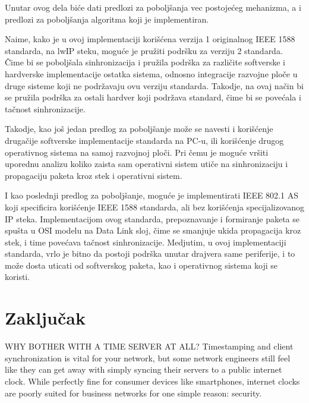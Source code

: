 \documentclass[a4paper,12pt, master]{etf}
\begin{document}
	Unutar ovog dela bi\'{c}e dati predlozi za pobolj\v{s}anja vec
	postoje\'{c}eg mehanizma, a i predlozi za pobolj\v{s}anja algoritma koji je
	implementiran.

	Naime, kako je u ovoj implementaciji kori\v{s}\'{c}ena verzija 1
	originalnog IEEE 1588 standarda, na lwIP steku, mogu\'{c}e je pru\v{z}iti
	podr\v{s}ku za verziju 2 standarda. \v{C}ime bi se pobolj\v{s}ala
	sinhronizacija i pru\v{z}ila podr\v{s}ka za razli\v{c}ite softverske i
	hardverske implementacije ostatka sistema, odnosno integracije razvojne
	plo\v{c}e u druge sisteme koji ne podr\v{z}avaju ovu verziju standarda.
	Takodje, na ovaj na\v{c}in bi se pru\v{z}ila podr\v{s}ka za ostali hardver
	koji podr\v{z}ava standard, \v{c}ime bi se pove\'{c}ala i ta\v{c}nost
	sinhronizacije.

	Takodje, kao jo\v{s} jedan predlog za pobolj\v{s}anje mo\v{z}e se navesti i
	kori\v{s}\'{c}enje druga\v{c}ije softverske implementacije standarda na
	PC-u, ili kori\v{s}\'{c}enje drugog operativnog sistema na samoj razvojnoj
	plo\v{c}i. Pri \v{c}emu je mogu\'{c}e vr\v{s}iti uporednu analizu koliko
	zaista sam operativni sistem uti\v{c}e na sinhronizaciju i propagaciju
	paketa kroz stek i operativni sistem.

	I kao poslednji predlog za pobolj\v{s}anje, mogu\'{c}e je implementirati
	IEEE 802.1 AS koji specificira kori\v{s}\'{c}enje IEEE 1588 standarda, ali
	bez kori\v{s}\'{c}enja specijalizovanog IP steka. Implementacijom ovog
	standarda, prepoznavanje i formiranje paketa se spu\v{s}ta u OSI modelu na
	Data Link sloj, \v{c}ime se smanjuje ukida propagacija kroz stek, i time
	pove\'{c}ava ta\v{c}nost sinhronizacije. Medjutim, u ovoj implementaciji
	standarda, vrlo je bitno da postoji podr\v{s}ka unutar drajvera same
	periferije, i to mo\v{z}e dosta uticati od softverskog paketa, kao i
	operativnog sistema koji se koristi.

	\newpage

	\chapter{Zaključak}

	WHY BOTHER WITH A TIME SERVER AT ALL\@?
	Timestamping and client synchronization is vital for your network, but some network
	engineers still feel like they can get away with simply syncing their servers to a public
	internet clock. While perfectly fine for consumer devices like smartphones, internet
	clocks are poorly suited for business networks for one simple reason: security.
\end{document}
